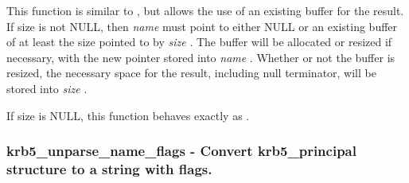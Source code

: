 \documentclass[letterpaper,10pt,english]{sphinxmanual}
\begin{document}
This function is similar to {\hyperref[appdev/refs/api/krb5_unparse_name:krb5_unparse_name]{}} , but allows the use of an existing buffer for the result. If size is not NULL, then \emph{name} must point to either NULL or an existing buffer of at least the size pointed to by \emph{size} . The buffer will be allocated or resized if necessary, with the new pointer stored into \emph{name} . Whether or not the buffer is resized, the necessary space for the result, including null terminator, will be stored into \emph{size} .

If size is NULL, this function behaves exactly as {\hyperref[appdev/refs/api/krb5_unparse_name:krb5_unparse_name]{}} .


\subsubsection{krb5\_unparse\_name\_flags -  Convert krb5\_principal structure to a string with flags.}
\label{appdev/refs/api/krb5_unparse_name_flags::doc}\label{appdev/refs/api/krb5_unparse_name_flags:krb5-unparse-name-flags-convert-krb5-principal-structure-to-a-string-with-flags}

\begin{fulllineitems}
\label{appdev/refs/api/krb5_unparse_name_flags:krb5_unparse_name_flags}
\end{fulllineitems}
\end{document}

